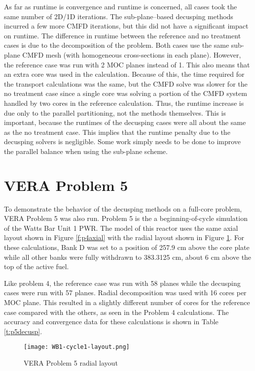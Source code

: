 As far as runtime is convergence and runtime is concerned, all cases took the same number of 2D/1D iterations.  The sub-plane--based decusping methods incurred a few more CMFD iterations, but this did not have a significant impact on runtime.  The difference in runtime between the reference and no treatment cases is due to the decomposition of the problem.  Both cases use the same sub-plane CMFD mesh (with homogeneous cross-sections in each plane).  However, the reference case was run with 2 MOC planes instead of 1.  This also means that an extra core was used in the calculation.  Because of this, the time required for the transport calculations was the same, but the CMFD solve was slower for the no treatment case since a single core was solving a portion of the CMFD system handled by two cores in the reference calculation.  Thus, the runtime increase is due only to the parallel partitioning, not the methods themselves.  This is important, because the runtimes of the decusping cases were all about the same as the no treatment case.  This implies that the runtime penalty due to the decusping solvers is negligible.  Some work simply needs to be done to improve the parallel balance when using the sub-plane scheme.

\section{VERA Problem 5}

To demonstrate the behavior of the decusping methods on a full-core problem, VERA Problem 5 was also run.  Problem 5 is the a beginning-of-cycle simulation of the Watts Bar Unit 1 PWR.  The model of this reactor uses the same axial layout shown in Figure \ref{f:p4axial} with the radial layout shown in Figure \ref{f:p5radial}.  For these calculations, Bank D was set to a position of 257.9 cm above the core plate while all other banks were fully withdrawn to 383.3125 cm, about 6 cm above the top of the active fuel.

Like problem 4, the reference case was run with 58 planes while the decusping cases were run with 57 planes.  Radial decomposition was used with 16 cores per MOC plane.  This resulted in a slightly different number of cores for the reference case compared with the others, as seen in the Problem 4 calculations.  The accuracy and convergence data for these calculations is shown in Table \ref{t:p5decusp}.

\begin{figure}[h]
\centering
\texttt{[image: WB1-cycle1-layout.png]}
\caption{VERA Problem 5 radial layout}\label{f:p5radial}
\end{figure}

